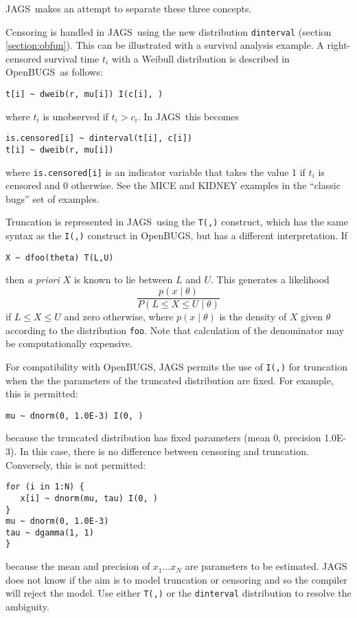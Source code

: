 \documentclass[11pt, a4paper, titlepage]{report}
\newcommand{\JAGS}{\textsf{JAGS}}
\newcommand{\OpenBUGS}{\textsf{OpenBUGS}}
\begin{document}
\JAGS\ makes an attempt to separate these three concepts.

Censoring is handled in \JAGS\ using the new distribution
\texttt{dinterval} (section \ref{section:obfun}). This can be
illustrated with a survival analysis example.  A right-censored
survival time $t_i$ with a Weibull distribution is described in
\OpenBUGS\ as follows:
\begin{verbatim}
t[i] ~ dweib(r, mu[i]) I(c[i], )
\end{verbatim}
where $t_i$ is unobserved if $t_i > c_i$.  In \JAGS\ this becomes
\begin{verbatim}
is.censored[i] ~ dinterval(t[i], c[i])
t[i] ~ dweib(r, mu[i])
\end{verbatim}
where \verb+is.censored[i]+ is an indicator variable that takes the
value 1 if $t_i$ is censored and 0 otherwise. See the MICE and KIDNEY
examples in the ``classic bugs'' set of examples.

Truncation is represented in \JAGS\ using the \texttt{T(,)} construct,
which has the same syntax as the \texttt{I(,)} construct in \OpenBUGS,
but has a different interpretation. If
\begin{verbatim}
X ~ dfoo(theta) T(L,U)
\end{verbatim}
then {\em a priori} $X$ is known to lie between $L$ and $U$. This
generates a likelihood
\[
\frac{p(x \mid \theta)}{P(L \leq X \leq U \mid \theta)}
\]
if $L \leq X \leq U$ and zero otherwise, where $p(x \mid \theta)$ is
the density of $X$ given $\theta$ according to the distribution
\texttt{foo}. Note that calculation of the denominator may be
computationally expensive.

For compatibility with OpenBUGS, JAGS permits the use of \texttt{I(,)}
for truncation when the the parameters of the truncated distribution
are fixed.  For example, this is permitted:
\begin{verbatim}
mu ~ dnorm(0, 1.0E-3) I(0, )
\end{verbatim}
because the truncated distribution has fixed parameters (mean 0,
precision 1.0E-3).  In this case, there is no difference between 
censoring and truncation.  Conversely, this is not permitted:
\begin{verbatim}
for (i in 1:N) {
   x[i] ~ dnorm(mu, tau) I(0, )
}
mu ~ dnorm(0, 1.0E-3)
tau ~ dgamma(1, 1)
}
\end{verbatim}
because the mean and precision of $x_1 \dots x_N$ are parameters to be
estimated.  JAGS does not know if the aim is to model truncation or censoring
and so the compiler will reject the model. Use either \texttt{T(,)} or the
\texttt{dinterval} distribution to resolve the ambiguity.
\end{document}
